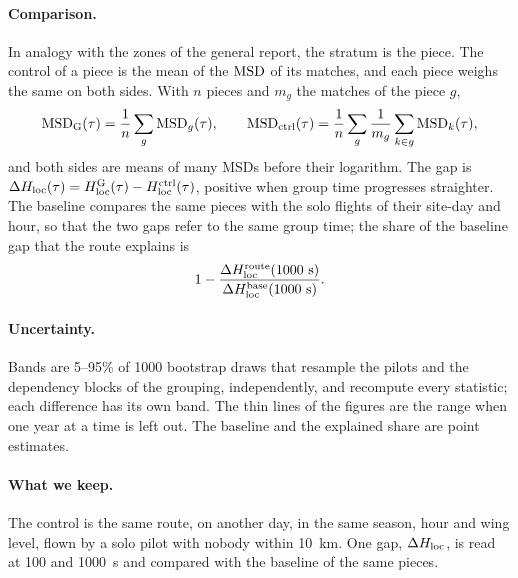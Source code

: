 \paragraph{Comparison.} In analogy with the zones of the general report, the stratum is the piece.
The control of a piece is the mean of the $\mathrm{MSD}$ of its matches, and each piece weighs the same on
both sides. With $n$ pieces and $m_g$ the matches of the piece $g$,
\begin{equation}\label{eq:reweight}
  \mathrm{MSD}_{\mathrm{G}}(\tau)=\frac1n\sum_{g}\mathrm{MSD}_g(\tau),\qquad
  \mathrm{MSD}_{\mathrm{ctrl}}(\tau)=\frac1n\sum_{g}\frac1{m_g}\sum_{k\in g}\mathrm{MSD}_k(\tau),
\end{equation}
and both sides are means of many MSDs before their logarithm. The gap is
$\Delta H_\mathrm{loc}(\tau)=H_\mathrm{loc}^{\mathrm{G}}(\tau)-H_\mathrm{loc}^{\mathrm{ctrl}}(\tau)$, positive when group time progresses
straighter. The baseline compares the same pieces with the solo flights of their site-day and hour, so
that the two gaps refer to the same group time; the share of the baseline gap that the route explains is
\begin{equation}\label{eq:explained}
  1-\frac{\Delta H_\mathrm{loc}^{\mathrm{route}}(1000~\mathrm{s})}{\Delta H_\mathrm{loc}^{\mathrm{base}}(1000~\mathrm{s})}.
\end{equation}

\paragraph{Uncertainty.} Bands are 5--95\% of 1000 bootstrap draws that resample the pilots and
the dependency blocks of the grouping, independently, and recompute every statistic; each difference has
its own band. The thin lines of the figures are the range when one year at a time is left out. The
baseline and the explained share are point estimates.

\paragraph{What we keep.} The control is the same route, on another day, in the same season, hour and
wing level, flown by a solo pilot with nobody within 10~km. One gap, $\Delta H_\mathrm{loc}$, is read at 100 and
1000~s and compared with the baseline of the same pieces.
